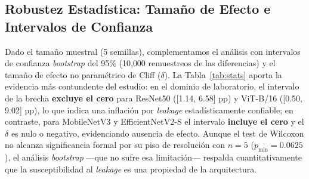 \documentclass[journal,compsoc]{IEEEtran}
\begin{document}
\subsection{Robustez Estadística: Tamaño de Efecto e Intervalos de Confianza}
Dado el tamaño muestral (5 semillas), complementamos el análisis con intervalos de confianza \textit{bootstrap} del 95\% (10{,}000 remuestreos de las diferencias) y el tamaño de efecto no paramétrico de Cliff ($\delta$). La Tabla~\ref{tab:stats} aporta la evidencia más contundente del estudio: en el dominio de laboratorio, el intervalo de la brecha \textbf{excluye el cero} para ResNet50 ([1.14, 6.58] pp) y ViT-B/16 ([0.50, 9.02] pp), lo que indica una inflación por \textit{leakage} estadísticamente confiable; en contraste, para MobileNetV3 y EfficientNetV2-S el intervalo \textbf{incluye el cero} y el $\delta$ es nulo o negativo, evidenciando ausencia de efecto. Aunque el test de Wilcoxon no alcanza significancia formal por su piso de resolución con $n=5$ ($p_{\min}=0.0625$), el análisis \textit{bootstrap} ---que no sufre esa limitación--- respalda cuantitativamente que la susceptibilidad al \textit{leakage} es una propiedad de la arquitectura.

\begin{table}[H]
\centering
\caption{Brecha de Exactitud, IC Bootstrap 95\% y Tamaño de Efecto de Cliff ($\delta$)}
\label{tab:stats}
\end{table}
\end{document}

